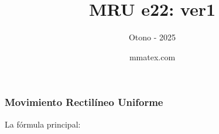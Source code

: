 \documentclass{beamer}
\title{MRU e22: ver1}
\subtitle{Otono - 2025}
\author{mmatex.com}
\begin{document}
\maketitle

\begin{frame}
\frametitle{Movimiento Rectil\'ineo Uniforme}
% 
 La f\'ormula principal:

                                                               
 
{\huge \vmru}
\vNUa
                                                               
                                                               
                                                               
                                                               
\end{frame}
\end{document}
